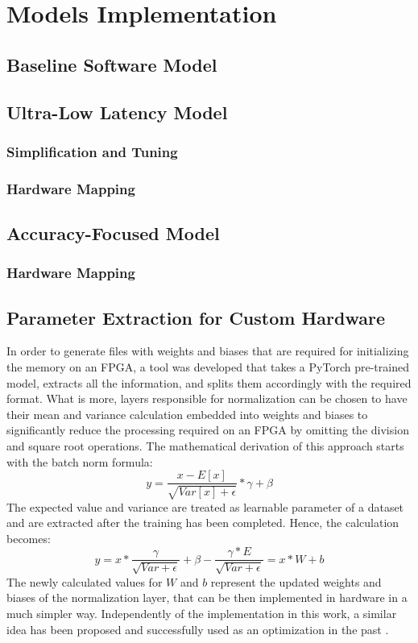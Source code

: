 \chapter{Models Implementation}\label{models}

\section{Baseline Software Model}


\section{Ultra-Low Latency Model}

\subsection{Simplification and Tuning}

\subsection{Hardware Mapping}


\section{Accuracy-Focused Model}

\subsection{Hardware Mapping}


\section{Parameter Extraction for Custom Hardware}

In order to generate files with weights and biases that are required for initializing the memory on an FPGA, a tool was developed that takes a PyTorch pre-trained model, extracts all the information, and splits them accordingly with the required format. What is more, layers responsible for normalization can be chosen to have their mean and variance calculation embedded into weights and biases to significantly reduce the processing required on an FPGA by omitting the division and square root operations. The mathematical derivation of this approach starts with the batch norm formula:
\[ y = \frac{x - E[x]}{\sqrt{Var[x] + \epsilon}} * \gamma + \beta \]
The expected value and variance are treated as learnable parameter of a dataset and are extracted after the training has been completed. Hence, the calculation becomes:
\[ y = x * \frac{\gamma}{\sqrt{Var + \epsilon}} + \beta - \frac{\gamma * E}{\sqrt{Var + \epsilon}} = x * W + b\]
The newly calculated values for \(W\) and \(b\) represent the updated weights and biases of the normalization layer, that can be then implemented in hardware in a much simpler way. Independently of the implementation in this work, a similar idea has been proposed and successfully used as an optimization in the past \cite{46-fan2018real-time}.

